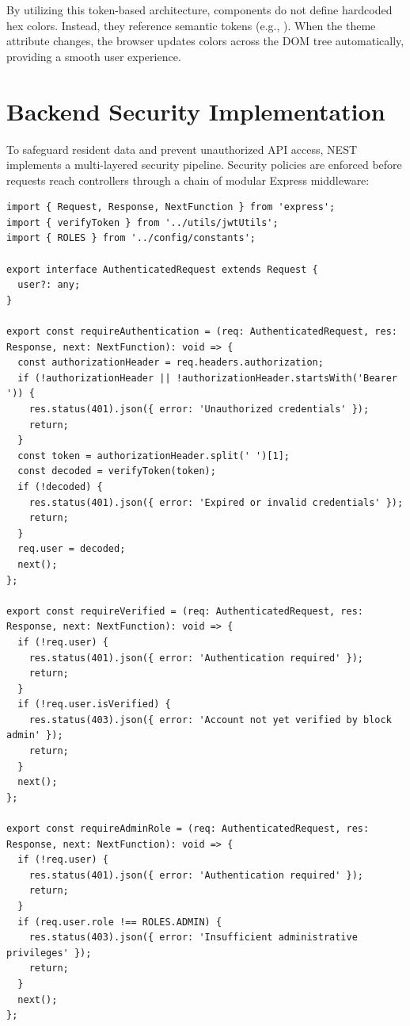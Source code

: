 By utilizing this token-based architecture, components do not define hardcoded hex colors. Instead, they reference semantic tokens (e.g., ). When the theme attribute changes, the browser updates colors across the DOM tree automatically, providing a smooth user experience.

\section{Backend Security Implementation}
To safeguard resident data and prevent unauthorized API access, NEST implements a multi-layered security pipeline. Security policies are enforced before requests reach controllers through a chain of modular Express middleware:

\begin{lstlisting}[caption={Express Security Middleware Chain}, label={lst:security-middleware}]
import { Request, Response, NextFunction } from 'express';
import { verifyToken } from '../utils/jwtUtils';
import { ROLES } from '../config/constants';

export interface AuthenticatedRequest extends Request {
  user?: any;
}

export const requireAuthentication = (req: AuthenticatedRequest, res: Response, next: NextFunction): void => {
  const authorizationHeader = req.headers.authorization;
  if (!authorizationHeader || !authorizationHeader.startsWith('Bearer ')) {
    res.status(401).json({ error: 'Unauthorized credentials' });
    return;
  }
  const token = authorizationHeader.split(' ')[1];
  const decoded = verifyToken(token);
  if (!decoded) {
    res.status(401).json({ error: 'Expired or invalid credentials' });
    return;
  }
  req.user = decoded;
  next();
};

export const requireVerified = (req: AuthenticatedRequest, res: Response, next: NextFunction): void => {
  if (!req.user) {
    res.status(401).json({ error: 'Authentication required' });
    return;
  }
  if (!req.user.isVerified) {
    res.status(403).json({ error: 'Account not yet verified by block admin' });
    return;
  }
  next();
};

export const requireAdminRole = (req: AuthenticatedRequest, res: Response, next: NextFunction): void => {
  if (!req.user) {
    res.status(401).json({ error: 'Authentication required' });
    return;
  }
  if (req.user.role !== ROLES.ADMIN) {
    res.status(403).json({ error: 'Insufficient administrative privileges' });
    return;
  }
  next();
};
\end{lstlisting}

